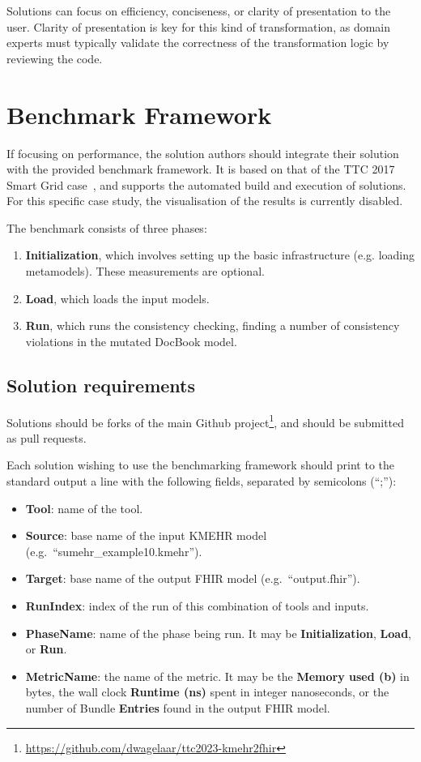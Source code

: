 \documentclass[
twocolumn,
]{ceurart}
\begin{document}
Solutions can focus on efficiency, conciseness, or clarity of presentation to
the user. Clarity of presentation is key for this kind of transformation, as
domain experts must typically validate the correctness of the transformation
logic by reviewing the code.

\section{Benchmark Framework}
\label{sec:benchmark-framework}

If focusing on performance, the solution authors should integrate their solution
with the provided benchmark framework. It is based on that of the TTC 2017 Smart
Grid case~\cite{hinkel_ttc_2017}, and supports the automated build and execution
of solutions. For this specific case study, the visualisation of the results is
currently disabled.

The benchmark consists of three phases:

\begin{enumerate}
\item \textbf{Initialization}, which involves setting up the basic
  infrastructure (e.g. loading metamodels). These measurements are optional.
\item \textbf{Load}, which loads the input models.
\item \textbf{Run}, which runs the consistency checking, finding a number of
  consistency violations in the mutated DocBook model.
\end{enumerate}

\subsection{Solution requirements}
\label{sec:solut-requ}

Solutions should be forks of the main Github
project\footnote{\url{https://github.com/dwagelaar/ttc2023-kmehr2fhir}},
and should be submitted as pull requests.

Each solution wishing to use the benchmarking framework should print to the
standard output a line with the following fields, separated by semicolons
(``;''):

\begin{itemize}
\item \textbf{Tool}: name of the tool.
\item \textbf{Source}: base name of the input KMEHR model (e.g.\ ``sumehr\_example10.kmehr'').
\item \textbf{Target}: base name of the output FHIR model (e.g.\ ``output.fhir'').
\item \textbf{RunIndex}: index of the run of this combination of tools and inputs.
\item \textbf{PhaseName}: name of the phase being run. It may be \textbf{Initialization},
  \textbf{Load}, or \textbf{Run}.
\item \textbf{MetricName}: the name of the metric. It may be the
  \textbf{Memory used (b)} in bytes, the wall clock \textbf{Runtime (ns)} spent in integer
  nanoseconds, or the number of Bundle \textbf{Entries} found in the
  output FHIR model.
\end{itemize}
\end{document}
